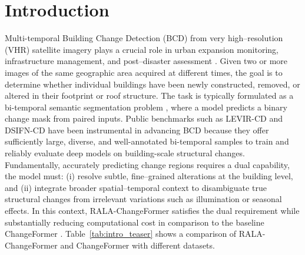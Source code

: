 \documentclass[runningheads]{llncs}
\begin{document}
\section{Introduction}
\label{sec:introduction}

Multi-temporal Building Change Detection (BCD) from very high–resolution (VHR)
satellite imagery plays a crucial role in urban expansion monitoring,
infrastructure management, and post–disaster assessment
\cite{Lu2020SUHI,Daudt2018SiamICIP,Zhang2020FusionNetDSIFN,Hussain2013Review}. Given two or more
images of the same geographic area acquired at different times, the goal is to
determine whether individual buildings have been newly constructed, removed, or
altered in their footprint or roof structure. The task is typically formulated
as a bi-temporal semantic segmentation problem
\cite{Shafique2022Review}, where a model predicts a binary
change mask from paired inputs. Public benchmarks such as LEVIR-CD
\cite{Zheng2020LEVIR} and DSIFN-CD \cite{Zhang2020FusionNetDSIFN} have been instrumental
in advancing BCD because they offer sufficiently large, diverse, and
well-annotated bi-temporal samples to train and reliably evaluate deep models on
building-scale structural changes. Fundamentally, accurately predicting change
regions requires a dual capability, the model must: (i) resolve subtle,
fine–grained alterations at the building level, and (ii) integrate broader
spatial–temporal context to disambiguate true structural changes from irrelevant
variations such as illumination or seasonal effects. In this context,
RALA-ChangeFormer \cite{Fan2025RALA} satisfies the dual requirement while
substantially reducing computational cost in comparison to the baseline
ChangeFormer \cite{Bandara2022ChangeFormer}.
Table~\ref{tab:intro_teaser} shows a comparison of RALA-ChangeFormer and
ChangeFormer with different datasets.

\begin{table}[t]
\centering
\caption{Comparison between ChangeFormer (CF) and the proposed
RALA-ChangeFormer (RALA-CF) on two benchmarks with input dimension
256 x 256 and batch 16~\cite{acuna2026efficient}).}
\label{tab:intro_teaser}
\end{table}
\end{document}
